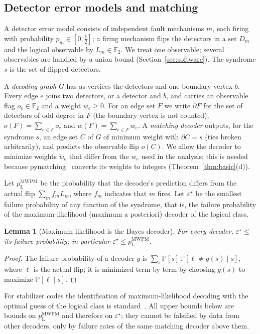 \documentclass[11pt]{article}
\theoremstyle{plain}
\newtheorem{lemma}{Lemma}
\theoremstyle{definition}
\theoremstyle{remark}
\newcommand{\F}{\mathbb{F}_2}
\newcommand{\Prob}{\mathbb{P}}
\newcommand{\pM}{p_{\mathrm{L}}^{\mathrm{MWPM}}}
\newcommand{\err}{\varepsilon^{\star}}
\newcommand{\tw}{\tilde w}
\renewcommand{\_}{\oldunderscore\allowbreak}
\begin{document}
\subsection{Detector error models and matching}

A detector error model consists of independent fault mechanisms $m$, each firing with probability $p_m\in[0,\tfrac12]$; a firing mechanism flips the detectors in a set $D_m$ and the logical observable by $L_m\in\F$. We treat one observable; several observables are handled by a union bound (Section~\ref{sec:software}). The syndrome $s$ is the set of flipped detectors.

A \emph{decoding graph} $G$ has as vertices the detectors and one boundary vertex $b$. Every edge $e$ joins two detectors, or a detector and $b$, and carries an observable flag $o_e\in\F$ and a weight $w_e\ge0$. For an edge set $F$ we write $\partial F$ for the set of detectors of odd degree in $F$ (the boundary vertex is not counted), $o(F)=\sum_{e\in F}o_e$ and $w(F)=\sum_{e\in F}w_e$. A \emph{matching decoder} outputs, for the syndrome $s$, an edge set $C$ of $G$ of minimum weight with $\partial C=s$ (ties broken arbitrarily), and predicts the observable flip $o(C)$. We allow the decoder to minimize weights $\tw_e$ that differ from the $w_e$ used in the analysis; this is needed because pymatching~\cite{SB} converts its weights to integers (Theorem~\ref{thm:basic}(d)).

Let $\pM$ be the probability that the decoder's prediction differs from the actual flip $\sum_m f_mL_m$, where $f_m$ indicates that $m$ fires. Let $\err$ be the smallest failure probability of any function of the syndrome, that is, the failure probability of the maximum-likelihood (maximum a posteriori) decoder of the logical class.

\begin{lemma}[Maximum likelihood is the Bayes decoder]\label{lem:bayes}
For every decoder, $\err\le$ its failure probability; in particular $\err\le\pM$.
\end{lemma}
\begin{proof}
The failure probability of a decoder $g$ is $\sum_s\Prob[s]\,\Prob[\ell\ne g(s)\mid s]$, where $\ell$ is the actual flip; it is minimized term by term by choosing $g(s)$ to maximize $\Prob[\ell\mid s]$.
\end{proof}

\noindent For stabilizer codes the identification of maximum-likelihood decoding with the optimal guess of the logical class is standard~\cite{DKLP,IyerPoulin,Pryadko}. All upper bounds below are bounds on $\pM$ and therefore on $\err$; they cannot be falsified by data from other decoders, only by failure rates of the same matching decoder above them.
\end{document}
